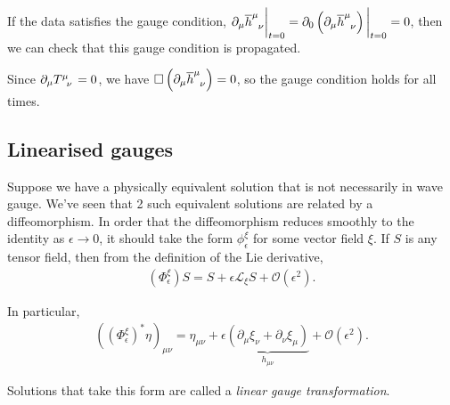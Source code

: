 If the data satisfies the gauge condition, $\partial_\mu \tensor{\overline{h}}{^{\mu}_{\nu}} \bigg|_{t=0} = \partial_0 \left( \partial_\mu \tensor{\overline{h}}{^{\mu}_\nu} \right) \bigg|_{t=0} =0$, then we can check that this gauge condition is propagated. 

Since $\partial_\mu \tensor{T}{^{\mu}_\nu} = 0$, we have $\Box \left( \partial_\mu \tensor{\overline{h}}{^{\mu}_{\nu}} \right) = 0$, so the gauge condition holds for all times.

\subsection{Linearised gauges}

Suppose we have a physically equivalent solution that is not necessarily in wave gauge. We've seen that 2 such equivalent solutions are related by a diffeomorphism. In order that the diffeomorphism reduces smoothly to the identity as $\epsilon \to 0$, it should take the form $\phi_{\epsilon}^{\xi}$ for some vector field $\xi$. If $S$ is any tensor field, then from the definition of the Lie derivative,
\begin{align}
    \left( \Phi_{\epsilon}^{\xi} \right) S = S + \epsilon \mathcal{L}_{\xi} S + \mathcal{O}\left( \epsilon^2 \right) 
.\end{align}

In particular,
\begin{align}
    \left( \left( \Phi_{\epsilon}^{\xi} \right)^{*} \eta \right)_{\mu \nu} = \eta_{\mu \nu} + \epsilon \underbrace{\left( \partial_\mu \xi_\nu + \partial_\nu \xi_\mu \right)}_{h_{\mu \nu}} + \mathcal{O}\left( \epsilon^2 \right)  
.\end{align}

Solutions that take this form are called a \emph{linear gauge transformation}.


